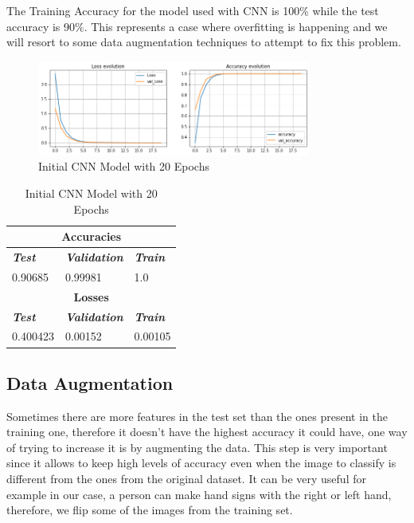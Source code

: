 \documentclass[conference]{IEEEtran}
\begin{document}
The Training Accuracy for the model used with CNN is 100\% while the test accuracy is 90\%. This represents a case where overfitting is happening and we will resort to some data augmentation techniques to attempt to fix this problem.

\begin{figure}[htbp]
    \centerline{\includegraphics[width=9cm]{img/initial_model_noDataAug_20ep.png}}
    \caption{Initial CNN Model with 20 Epochs}
    \label{fig:hist_train_classes}
\end{figure}

\begin{table}[htbp]
\caption{Initial CNN Model with 20 Epochs}
\begin{center}
\begin{tabular}{|p{2cm}|p{2cm}|p{2cm}|}
\hline
\multicolumn{3}{|c|}{\textbf{Accuracies}} \\
\hline
\textbf{\textit{Test}}& \textbf{\textit{Validation}}& \textbf{\textit{Train}} \\
\hline
0.90685 & 0.99981 & 1.0 \\
\hline
\multicolumn{3}{|c|}{\textbf{Losses}} \\
\hline
\textbf{\textit{Test}}& \textbf{\textit{Validation}}& \textbf{\textit{Train}} \\
\hline
0.400423 & 0.00152 & 0.00105 \\
\hline
\end{tabular}
\end{center}
\end{table}

\subsection{Data Augmentation}

Sometimes there are more features in the test set than the ones present in the training one, therefore it doesn't have the highest accuracy it could have, one way of trying to increase it is by augmenting the data. This step is very important since it allows to keep high levels of accuracy even when the image to classify is different from the ones from the original dataset. It can be very useful for example in our case, a person can make hand signs with the right or left hand, therefore, we flip some of the images from the training set.
\end{document}
